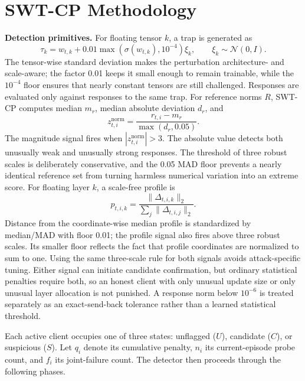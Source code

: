 \documentclass[conference]{IEEEtran}
\begin{document}
\section{SWT-CP Methodology}
\noindent\textbf{Detection primitives.}
For floating tensor $k$, a trap is generated as
\begin{equation}
\tau_k=w_{t,k}+0.01\max(\sigma(w_{t,k}),10^{-4})\xi_k,
\qquad \xi_k\sim\mathcal N(0,I).
\end{equation}
The tensor-wise standard deviation makes the perturbation architecture- and scale-aware; the factor 0.01 keeps it small enough to remain trainable, while the $10^{-4}$ floor ensures that nearly constant tensors are still challenged. Responses are evaluated only against responses to the same trap. For reference norms $R$, SWT-CP computes median $m_r$, median absolute deviation $d_r$, and
\begin{equation}
z^{\mathrm{norm}}_{t,i}=\frac{r_{t,i}-m_r}{\max(d_r,0.05)}.
\end{equation}
The magnitude signal fires when $|z^{\mathrm{norm}}_{t,i}|>3$. The absolute value detects both unusually weak and unusually strong responses. The threshold of three robust scales is deliberately conservative, and the 0.05 MAD floor prevents a nearly identical reference set from turning harmless numerical variation into an extreme score. For floating layer $k$, a scale-free profile is
\begin{equation}
p_{t,i,k}=\frac{\lVert\Delta_{t,i,k}\rVert_2}
{\sum_j\lVert\Delta_{t,i,j}\rVert_2}.
\end{equation}
Distance from the coordinate-wise median profile is standardized by median/MAD with floor 0.01; the profile signal also fires above three robust scales. Its smaller floor reflects the fact that profile coordinates are normalized to sum to one. Using the same three-scale rule for both signals avoids attack-specific tuning. Either signal can initiate candidate confirmation, but ordinary statistical penalties require both, so an honest client with only unusual update size or only unusual layer allocation is not punished. A response norm below $10^{-6}$ is treated separately as an exact-send-back tolerance rather than a learned statistical threshold.

Each active client occupies one of three states: unflagged ($U$), candidate ($C$), or suspicious ($S$). Let $q_i$ denote its cumulative penalty, $n_i$ its current-episode probe count, and $f_i$ its joint-failure count. The detector then proceeds through the following phases.
\end{document}
